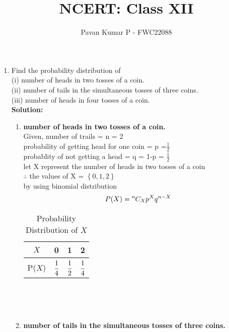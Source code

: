\documentclass{article}
\providecommand{\cbrak}[1]{\ensuremath{\left\{#1\right\}}}
\newcommand{\solution}{\noindent \textbf{Solution: }}
\newcommand*{\permcomb}[4][0mu]{{{}^{#3}\mkern#1#2_{#4}}}
\newcommand*{\comb}[1][-1mu]{\permcomb[#1]{C}}
\newcommand\T{\rule{0pt}{2.6ex}}       %
\begin{document}
\title{NCERT: Class XII}
\author{\Large Pavan Kumar P - FWC22088}
\date{}

\maketitle

\begin{enumerate}[label=13.\arabic{enumi}.\arabic{enumii}]

\setcounter{enumi}{3}
\setcounter{enumii}{4}

\item Find the probability distribution of\\
(i) number of heads in two tosses of a coin.\\
(ii) number of tails in the simultaneous tosses of three coins.\\
(iii) number of heads in four tosses of a coin.\\[1ex]
\solution
\begin{enumerate}
\item  \textbf{number of heads in two tosses of a coin.\\}
Given, number of trails = n = 2\\
probability of getting head for one coin = p =$\frac{1}{2}$\\
probablity of not getting a head = q = 1-p = $\frac{1}{2}$\\
let X represent the number of heads in two tosses of a coin\\
$\therefore$ the values of X = \cbrak{0,1,2} \\
 by using binomial distribution\\
 \begin{align}
 P(X) = \comb{n}{X}p^Xq^{n-X}
 \end{align}
	\begin{table}[h]
	\normalsize
	\centering
			\begin{tabular}[20pt]{|c|c|c|c|} \hline		%
			$X$&0&1&2 \T \\ \hline
			P($X$)&$\cfrac{1}{4}$&$\cfrac{1}{2}$&$\cfrac{1}{4}$\\[1.5ex] \hline
		\end{tabular}\\[2ex]
		\caption{Probability Distribution of $X$}
	\end{table}\\
\item \textbf{number of tails in the simultaneous tosses of three coins.}\\

\end{enumerate}
\end{enumerate}
\end{document}
